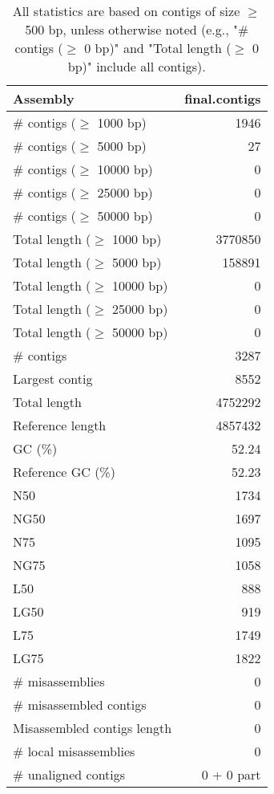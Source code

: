 \documentclass[12pt,a4paper]{article}
\begin{document}
\begin{table}[ht]
\begin{center}
\caption{All statistics are based on contigs of size $\geq$ 500 bp, unless otherwise noted (e.g., "\# contigs ($\geq$ 0 bp)" and "Total length ($\geq$ 0 bp)" include all contigs).}
\begin{tabular}{|l*{1}{|r}|}
\hline
Assembly & final.contigs \\ \hline
\# contigs ($\geq$ 1000 bp) & 1946 \\ \hline
\# contigs ($\geq$ 5000 bp) & 27 \\ \hline
\# contigs ($\geq$ 10000 bp) & 0 \\ \hline
\# contigs ($\geq$ 25000 bp) & 0 \\ \hline
\# contigs ($\geq$ 50000 bp) & 0 \\ \hline
Total length ($\geq$ 1000 bp) & 3770850 \\ \hline
Total length ($\geq$ 5000 bp) & 158891 \\ \hline
Total length ($\geq$ 10000 bp) & 0 \\ \hline
Total length ($\geq$ 25000 bp) & 0 \\ \hline
Total length ($\geq$ 50000 bp) & 0 \\ \hline
\# contigs & 3287 \\ \hline
Largest contig & 8552 \\ \hline
Total length & 4752292 \\ \hline
Reference length & 4857432 \\ \hline
GC (\%) & 52.24 \\ \hline
Reference GC (\%) & 52.23 \\ \hline
N50 & 1734 \\ \hline
NG50 & 1697 \\ \hline
N75 & 1095 \\ \hline
NG75 & 1058 \\ \hline
L50 & 888 \\ \hline
LG50 & 919 \\ \hline
L75 & 1749 \\ \hline
LG75 & 1822 \\ \hline
\# misassemblies & 0 \\ \hline
\# misassembled contigs & 0 \\ \hline
Misassembled contigs length & 0 \\ \hline
\# local misassemblies & 0 \\ \hline
\# unaligned contigs & 0 + 0 part \\ \hline

\end{tabular}
\end{center}
\end{table}
\end{document}
